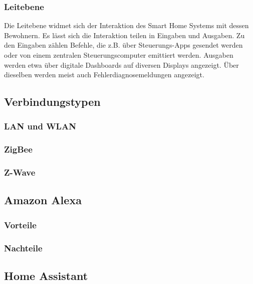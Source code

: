 \subsubsection{Leitebene}

Die Leitebene widmet sich der Interaktion des Smart Home Systems mit dessen Bewohnern.
Es lässt sich die Interaktion teilen in Eingaben und Ausgaben.
Zu den Eingaben zählen Befehle, die z.B. über Steuerungs-Apps gesendet werden oder von einem zentralen Steuerungscomputer emittiert werden.
Ausgaben werden etwa über digitale Dashboards auf diversen Displays angezeigt.
Über dieselben werden meist auch Fehlerdiagnosemeldungen angezeigt.


\subsection{Verbindungstypen} %

\subsubsection{LAN und WLAN}
\subsubsection{ZigBee}
\subsubsection{Z-Wave}

\subsection{Amazon Alexa}


\subsubsection{Vorteile}
\subsubsection{Nachteile}

\subsection{Home Assistant}

